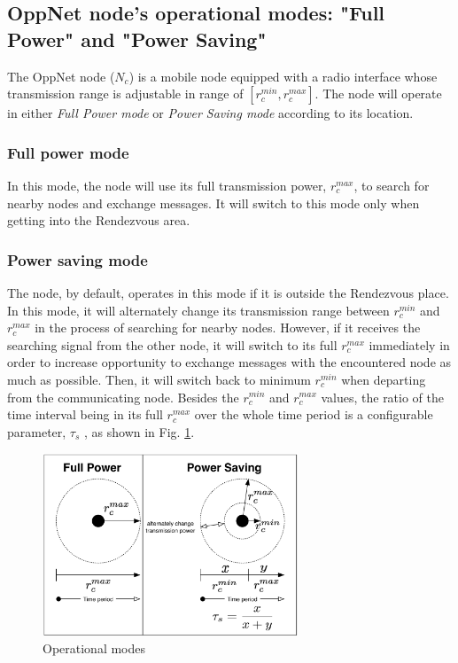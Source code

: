 \subsection{OppNet node's operational modes: "Full Power" and "Power Saving"}
The OppNet node ($N_{c}$) is a mobile node equipped with a radio interface whose transmission range is adjustable in range of $[{ r }_{ c }^{ min },{ r }_{ c }^{ max }]$.
The node will operate in either \emph{Full Power mode} or \emph{Power Saving mode} according to its location.

\subsubsection{Full power mode}

In this mode, the node will use its full transmission power, ${ r }_{ c }^{ max }$, to search for nearby nodes and exchange messages.
%
It will switch to this mode only when getting into the Rendezvous area.

\subsubsection{Power saving mode}
The node, by default, operates in this mode if it is outside the Rendezvous place.
%
In this mode, it will alternately change its transmission range between ${ r }_{ c }^{ min }$ and ${ r }_{ c }^{ max }$ in the process of searching for nearby nodes.
%
However, if it receives the searching signal from the other node, it will switch to its full ${ r }_{ c }^{ max }$ immediately in order to increase opportunity to exchange messages with the encountered node as much as possible.
%
Then, it will switch back to minimum ${ r }_{ c }^{ min }$ when departing from the communicating node.
%
Besides the ${ r }_{ c }^{ min }$ and ${ r }_{ c }^{ max }$ values, the ratio of the time interval being in its full ${ r }_{ c }^{ max }$ over the whole time period is a configurable parameter, $\tau_{s}$ , as shown in Fig. \ref{Operational modes}.

\begin{figure}[!t]
	\centering
	\includegraphics[width=3in]{Figures/OperationalMode.pdf}
	\caption{Operational modes}
	\label{Operational modes}
\end{figure}


